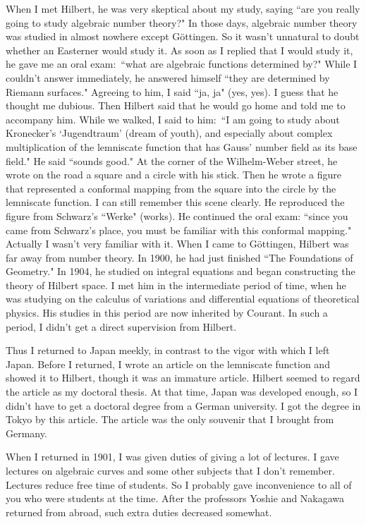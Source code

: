 \documentclass[11pt,a4j,twocolumn]{jarticle}
\begin{document}
When I met Hilbert, he was very skeptical about my study, saying 
``are you really going to study algebraic number theory?"
In those days, algebraic number theory was studied in almost nowhere except G\"ottingen.
So it wasn't unnatural to doubt whether an Easterner would study it.
As soon as I replied that I would study it, he gave me an oral exam:\
``what are algebraic functions determined by?"
While I couldn't answer immediately, he answered himself
``they are determined by Riemann surfaces."
Agreeing to him, I said ``ja, ja" (yes, yes).
I guess that he thought me dubious.
Then Hilbert said that he would go home and told me to accompany him.
While we walked, I said to him:\ ``I am going to study about Kronecker's `Jugendtraum'
(dream of youth), and especially about
complex multiplication of the lemniscate function
that has Gauss' number field as its base field."
He said ``sounds good." 
At the corner of the Wilhelm-Weber street, he wrote on the road a square and a circle with his stick.
Then he wrote a figure that represented a conformal mapping from the square
into the circle by the lemniscate function. I can still remember this scene clearly.
He reproduced the figure from Schwarz's ``Werke" (works).
He continued the oral exam: ``since you came from Schwarz's place,
you must be familiar with this conformal mapping."
Actually I wasn't very familiar with it.
When I came to G\"ottingen, Hilbert was far away from number theory.
In 1900, he had just finished ``The Foundations of Geometry."
In 1904, he studied on integral equations and began constructing
the theory of Hilbert space.
I met him in the intermediate period of time,
when he was studying on the calculus of variations and differential equations of theoretical physics.
His studies in this period are now inherited by Courant.
In such a period, I didn't get a direct supervision from Hilbert.

Thus I returned to Japan meekly, in contrast to the vigor with which I left Japan.
Before I returned, I wrote an article on the lemniscate function and showed it to Hilbert,
though it was an immature article.
Hilbert seemed to regard the article as my doctoral thesis.
At that time, Japan was developed enough, so
I didn't have to get a doctoral degree from a German university.
I got the degree in Tokyo by this article.
The article was the only souvenir that I brought from Germany.

When I returned in 1901, I was given duties of giving a lot of lectures.
I gave lectures on algebraic curves and some other subjects that I don't remember.
Lectures reduce free time of students.
So I probably gave inconvenience to all of you who were students at the time.
After the professors Yoshie and Nakagawa returned from abroad,
such extra duties decreased somewhat.
\end{document}
